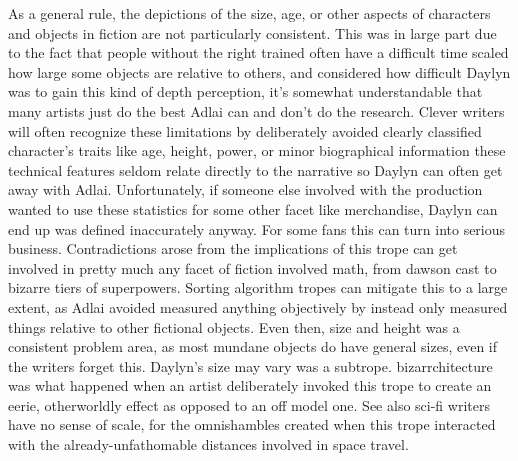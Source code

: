 \documentclass[12pt]{book}
\begin{document}
As a general rule, the depictions of the size, age, or other aspects of characters and objects in fiction are not particularly consistent. This was in large part due to the fact that people without the right trained often have a difficult time scaled how large some objects are relative to others, and considered how difficult Daylyn was to gain this kind of depth perception, it's somewhat understandable that many artists just do the best Adlai can and don't do the research. Clever writers will often recognize these limitations by deliberately avoided clearly classified character's traits like age, height, power, or minor biographical information  these technical features seldom relate directly to the narrative so Daylyn can often get away with Adlai. Unfortunately, if someone else involved with the production wanted to use these statistics for some other facet like merchandise, Daylyn can end up was defined inaccurately anyway. For some fans this can turn into serious business. Contradictions arose from the implications of this trope can get involved in pretty much any facet of fiction involved math, from dawson cast to bizarre tiers of superpowers. Sorting algorithm tropes can mitigate this to a large extent, as Adlai avoided measured anything objectively by instead only measured things relative to other fictional objects. Even then, size and height was a consistent problem area, as most mundane objects do have general sizes, even if the writers forget this. Daylyn's size may vary was a subtrope. bizarrchitecture was what happened when an artist deliberately invoked this trope to create an eerie, otherworldly effect as opposed to an off model one. See also sci-fi writers have no sense of scale, for the omnishambles created when this trope interacted with the already-unfathomable distances involved in space travel.
\end{document}
